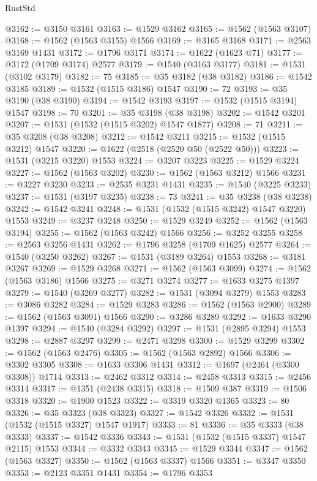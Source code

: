 \begin{lexlean}{RustStd}
\begin{coremodule}
@3162 := @3150 @3161
@3163 := @1529 @3162
@3165 := @1562 (@1563 @3107)
@3168 := @1562 (@1563 @3155) @1566
@3169 := @3165 @3168
@3171 := @2563 @3169 @1431
@3172 := @1796 @3171
@3174 := @1622 (@1623 @71)
@3177 := @3172 (@1709 @3174) @2577
@3179 := @1540 (@3163 @3177)
@3181 := @1531 (@3102 @3179)
@3182 := 75
@3185 := @35 @3182 (@38 @3182)
@3186 := @1542 @3185
@3189 := @1532 (@1515 @3186) @1547
@3190 := 72
@3193 := @35 @3190 (@38 @3190)
@3194 := @1542 @3193
@3197 := @1532 (@1515 @3194) @1547
@3198 := 70
@3201 := @35 @3198 (@38 @3198)
@3202 := @1542 @3201
@3207 := @1531 (@1532 (@1515 @3202) @1547 @1877)
@3208 := 71
@3211 := @35 @3208 (@38 @3208)
@3212 := @1542 @3211
@3215 := @1532 (@1515 @3212) @1547
@3220 := @1622 (@2518 (@2520 @50 (@2522 @50)))
@3223 := @1531 (@3215 @3220) @1553
@3224 := @3207 @3223
@3225 := @1529 @3224
@3227 := @1562 (@1563 @3202)
@3230 := @1562 (@1563 @3212) @1566
@3231 := @3227 @3230
@3233 := @2535 @3231 @1431
@3235 := @1540 (@3225 @3233)
@3237 := @1531 (@3197 @3235)
@3238 := 73
@3241 := @35 @3238 (@38 @3238)
@3242 := @1542 @3241
@3248 := @1531 (@1532 (@1515 @3242) @1547 @3220) @1553
@3249 := @3237 @3248
@3250 := @1529 @3249
@3252 := @1562 (@1563 @3194)
@3255 := @1562 (@1563 @3242) @1566
@3256 := @3252 @3255
@3258 := @2563 @3256 @1431
@3262 := @1796 @3258 (@1709 @1625) @2577
@3264 := @1540 (@3250 @3262)
@3267 := @1531 (@3189 @3264) @1553
@3268 := @3181 @3267
@3269 := @1529 @3268
@3271 := @1562 (@1563 @3099)
@3274 := @1562 (@1563 @3186) @1566
@3275 := @3271 @3274
@3277 := @1633 @3275 @1397
@3279 := @1540 (@3269 @3277)
@3282 := @1531 (@3094 @3279) @1553
@3283 := @3086 @3282
@3284 := @1529 @3283
@3286 := @1562 (@1563 @2900)
@3289 := @1562 (@1563 @3091) @1566
@3290 := @3286 @3289
@3292 := @1633 @3290 @1397
@3294 := @1540 (@3284 @3292)
@3297 := @1531 (@2895 @3294) @1553
@3298 := @2887 @3297
@3299 := @2471 @3298
@3300 := @1529 @3299
@3302 := @1562 (@1563 @2476)
@3305 := @1562 (@1563 @2892) @1566
@3306 := @3302 @3305
@3308 := @1633 @3306 @1431
@3312 := @1697 (@2464 (@3300 @3308)) @1714
@3313 := @2462 @3312
@3314 := @2458 @3313
@3315 := @2456 @3314
@3317 := @1351 (@2438 @3315)
@3318 := @1509 @387
@3319 := @1506 @3318
@3320 := @1900 @1523
@3322 := @3319 @3320 @1365
@3323 := 80
@3326 := @35 @3323 (@38 @3323)
@3327 := @1542 @3326
@3332 := @1531 (@1532 (@1515 @3327) @1547 @1917)
@3333 := 81
@3336 := @35 @3333 (@38 @3333)
@3337 := @1542 @3336
@3343 := @1531 (@1532 (@1515 @3337) @1547 @2115) @1553
@3344 := @3332 @3343
@3345 := @1529 @3344
@3347 := @1562 (@1563 @3327)
@3350 := @1562 (@1563 @3337) @1566
@3351 := @3347 @3350
@3353 := @2123 @3351 @1431
@3354 := @1796 @3353

\end{coremodule}
\end{lexlean}
